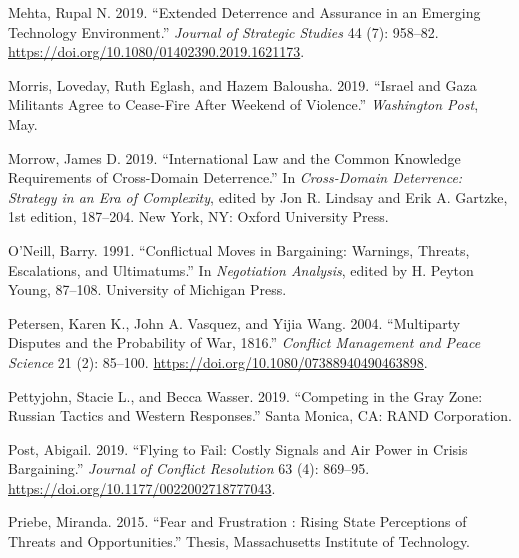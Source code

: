 \documentclass[
]{article}
\newlength{\cslhangindent}
\newlength{\cslentryspacingunit} %
\newenvironment{CSLReferences}[2] %
 {%
  \setlength{\parindent}{0pt}
  \ifodd #1
  \let\oldpar\par
  \def\par{\hangindent=\cslhangindent\oldpar}
  \fi
  \setlength{\parskip}{#2\cslentryspacingunit}
 }%
 {}
\begin{document}
\begin{CSLReferences}{1}{0}
\leavevmode{}%
Mehta, Rupal N. 2019. {``Extended Deterrence and Assurance in an Emerging Technology Environment.''} \emph{Journal of Strategic Studies} 44 (7): 958--82. \url{https://doi.org/10.1080/01402390.2019.1621173}.

\leavevmode{}%
Morris, Loveday, Ruth Eglash, and Hazem Balousha. 2019. {``Israel and {Gaza} Militants Agree to Cease-Fire After Weekend of Violence.''} \emph{Washington Post}, May.

\leavevmode{}%
Morrow, James D. 2019. {``International {Law} and the {Common Knowledge Requirements} of {Cross-Domain Deterrence}.''} In \emph{Cross-Domain Deterrence: Strategy in an Era of Complexity}, edited by Jon R. Lindsay and Erik A. Gartzke, 1st edition, 187--204. {New York, NY}: {Oxford University Press}.

\leavevmode{}%
O'Neill, Barry. 1991. {``Conflictual Moves in Bargaining: {Warnings}, Threats, Escalations, and Ultimatums.''} In \emph{Negotiation {Analysis}}, edited by H. Peyton Young, 87--108. {University of Michigan Press}.

\leavevmode{}%
Petersen, Karen K., John A. Vasquez, and Yijia Wang. 2004. {``Multiparty {Disputes} and the {Probability} of {War}, 1816.''} \emph{Conflict Management and Peace Science} 21 (2): 85--100. \url{https://doi.org/10.1080/07388940490463898}.

\leavevmode{}%
Pettyjohn, Stacie L., and Becca Wasser. 2019. {``Competing in the {Gray Zone}: {Russian Tactics} and {Western Responses}.''} {Santa Monica, CA}: {RAND Corporation}.

\leavevmode{}%
Post, Abigail. 2019. {``Flying to {Fail}: {Costly Signals} and {Air Power} in {Crisis Bargaining}.''} \emph{Journal of Conflict Resolution} 63 (4): 869--95. \url{https://doi.org/10.1177/0022002718777043}.

\leavevmode{}%
Priebe, Miranda. 2015. {``Fear and Frustration : Rising State Perceptions of Threats and Opportunities.''} Thesis, Massachusetts Institute of Technology.


\end{CSLReferences}
\end{document}
